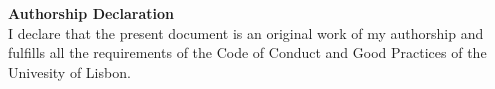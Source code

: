 \noindent\textbf{Authorship Declaration}\\
I declare that the present document is an original work of my authorship and fulfills all the requirements of the Code of Conduct and Good Practices of the Univesity of Lisbon.